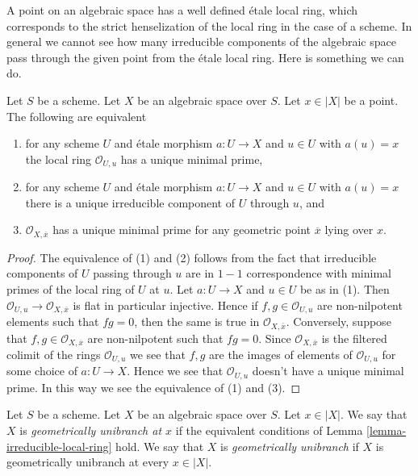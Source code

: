 \noindent
A point on an algebraic space has a well defined \'etale local ring, which
corresponds to the strict henselization of the local ring in the case of a
scheme. In general we cannot see how many irreducible components of the
algebraic space pass through the given point from the \'etale local ring.
Here is something we can do.

\begin{lemma}
\label{lemma-irreducible-local-ring}
Let $S$ be a scheme.
Let $X$ be an algebraic space over $S$.
Let $x \in |X|$ be a point.
The following are equivalent
\begin{enumerate}
\item for any scheme $U$ and \'etale morphism $a : U \to X$ and
$u \in U$ with $a(u) = x$ the local ring $\mathcal{O}_{U, u}$ has a
unique minimal prime,
\item for any scheme $U$ and \'etale morphism $a : U \to X$ and
$u \in U$ with $a(u) = x$ there is a unique irreducible component of $U$
through $u$, and
\item $\mathcal{O}_{X, \overline{x}}$ has a unique minimal prime
for any geometric point $\overline{x}$ lying over $x$.
\end{enumerate}
\end{lemma}

\begin{proof}
The equivalence of (1) and (2) follows from the fact that irreducible
components of $U$ passing through $u$ are in $1-1$ correspondence with
minimal primes of the local ring of $U$ at $u$. Let $a : U \to X$ and
$u \in U$ be as in (1). Then
$\mathcal{O}_{U, u} \to \mathcal{O}_{X, \overline{x}}$
is flat in particular injective. Hence if $f, g \in \mathcal{O}_{U, u}$
are non-nilpotent elements such that $fg = 0$, then the same is true in
$\mathcal{O}_{X, \overline{x}}$. Conversely, suppose that
$f, g \in \mathcal{O}_{X, \overline{x}}$ are non-nilpotent such that
$fg = 0$. Since $\mathcal{O}_{X, \overline{x}}$ is the filtered colimit
of the rings $\mathcal{O}_{U, u}$ we see that $f, g$ are the images
of elements of $\mathcal{O}_{U, u}$ for some choice of $a : U \to X$.
Hence we see that $\mathcal{O}_{U, u}$ doesn't have a unique minimal prime.
In this way we see the equivalence of (1) and (3).
\end{proof}

\begin{definition}
\label{definition-unibranch}
Let $S$ be a scheme. Let $X$ be an algebraic space over $S$.
Let $x \in |X|$. We say that $X$ is {\it geometrically unibranch
at $x$} if the equivalent conditions of
Lemma \ref{lemma-irreducible-local-ring}
hold. We say that $X$ is {\it geometrically unibranch} if $X$ is
geometrically unibranch at every $x \in |X|$.
\end{definition}

